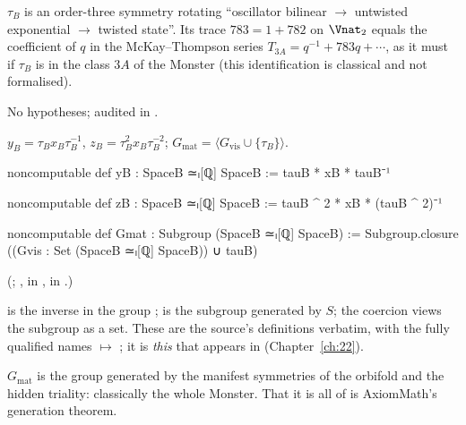 \begin{physics}
$\tau_B$ is an order-three symmetry rotating ``oscillator bilinear $\to$ untwisted exponential $\to$
twisted state''.  Its trace $783=1+782$ on $\Vnat_2$ equals the coefficient of $q$ in the
McKay--Thompson series $T_{3A}=q^{-1}+783q+\cdots$, as it must if $\tau_B$ is in the class $3A$ of
the Monster (this identification is classical and not formalised).
\end{physics}
\begin{status}
No hypotheses; audited in .
\end{status}

\begin{definition}\label{ch21:def:Gmat}
$y_B=\tau_Bx_B\tau_B^{-1}$, $z_B=\tau_B^2x_B\tau_B^{-2}$;
$G_{\mathrm{mat}}=\langle G_{\mathrm{vis}}\cup\{\tau_B\}\rangle$.
\end{definition}
\begin{leancode}
noncomputable def yB : SpaceB ≃ₗ[ℚ] SpaceB := tauB * xB * tauB⁻¹
\end{leancode}
\begin{leancode}
noncomputable def zB : SpaceB ≃ₗ[ℚ] SpaceB := tauB ^ 2 * xB * (tauB ^ 2)⁻¹
\end{leancode}
\begin{leancode}
noncomputable def Gmat : Subgroup (SpaceB ≃ₗ[ℚ] SpaceB) :=
  Subgroup.closure ((Gvis : Set (SpaceB ≃ₗ[ℚ] SpaceB)) ∪ {tauB})
\end{leancode}
(; ,  in
,  in .)
\begin{dictionary}
 is the inverse in the group ;  is the
subgroup generated by $S$; the coercion  views the subgroup as a set.  These are the
source's definitions verbatim, with the fully qualified names
 $\mapsto$ ; it is
\emph{this}  that appears in  (Chapter~\ref{ch:22}).
\end{dictionary}
\begin{physics}
$G_{\mathrm{mat}}$ is the group generated by the manifest symmetries of the orbifold and the hidden
triality: classically the whole Monster.  That it is all of  is AxiomMath's generation theorem.
\end{physics}
